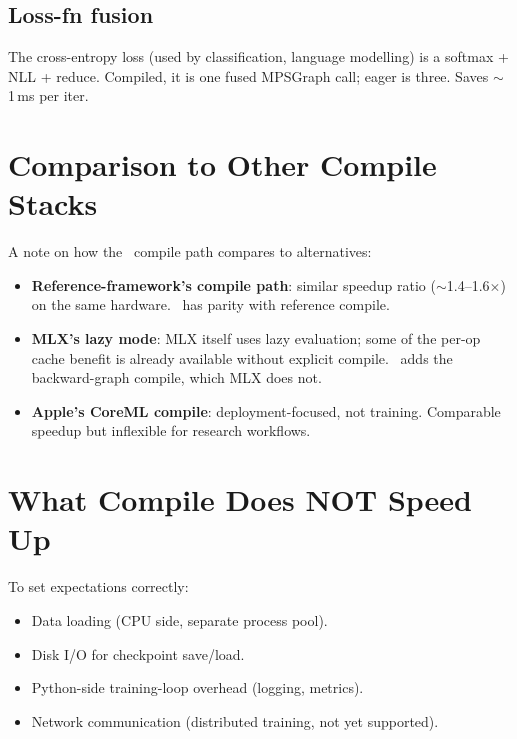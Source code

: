 \subsection{Loss-fn fusion}
\label{ssec:graph_capture_wins:loss_compile}

The cross-entropy loss (used by classification, language
modelling) is a softmax + NLL + reduce. Compiled, it is one
fused MPSGraph call; eager is three. Saves $\sim$\,1\,ms per
iter.

\section{Comparison to Other Compile Stacks}
\label{sec:graph_capture_wins:comparison}

A note on how the \Lucid\ compile path compares to alternatives:

\begin{itemize}
  \item \textbf{Reference-framework's compile path}: similar
    speedup ratio ($\sim$1.4--1.6$\times$) on the same hardware.
    \Lucid\ has parity with reference compile.
  \item \textbf{MLX's lazy mode}: MLX itself uses lazy
    evaluation; some of the per-op cache benefit is already
    available without explicit compile. \Lucid\ adds the
    backward-graph compile, which MLX does not.
  \item \textbf{Apple's CoreML compile}: deployment-focused,
    not training. Comparable speedup but inflexible for
    research workflows.
\end{itemize}

\section{What Compile Does NOT Speed Up}
\label{sec:graph_capture_wins:no_speedup}

To set expectations correctly:

\begin{itemize}
  \item Data loading (CPU side, separate process pool).
  \item Disk I/O for checkpoint save/load.
  \item Python-side training-loop overhead (logging,
    metrics).
  \item Network communication (distributed training, not
    yet supported).
\end{itemize}

